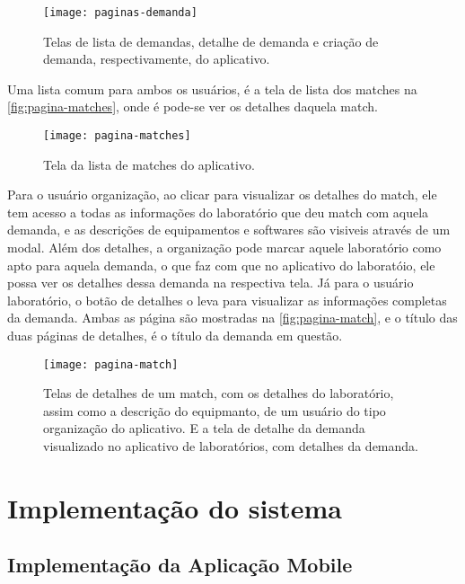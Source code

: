 \begin{figure}[htb]
  \captionsetup{width=0.43\textwidth}
  \caption{Telas de lista de demandas, detalhe de demanda e criação de demanda, respectivamente, do aplicativo.}
  \label{fig:paginas-demanda}
  \texttt{[image: paginas-demanda]}
  \fonte{}
\end{figure}

Uma lista comum para ambos os usuários, é a tela de lista dos matches na \autoref{fig:pagina-matches}, onde é pode-se ver os detalhes daquela match.

\begin{figure}[htb]
  \captionsetup{width=0.43\textwidth}
  \caption{Tela da lista de matches do aplicativo.}
  \label{fig:pagina-matches}
  \texttt{[image: pagina-matches]}
  \fonte{}
\end{figure}

Para o usuário organização, ao clicar para visualizar os detalhes do match, ele tem acesso a todas as informações do laboratório que deu match com aquela demanda, e as descrições de equipamentos e softwares são visiveis através de um modal. Além dos detalhes, a organização pode marcar aquele laboratório como apto para aquela demanda, o que faz com que no aplicativo do laboratóio, ele possa ver os detalhes dessa demanda na respectiva tela. Já para o usuário laboratório, o botão de detalhes o leva para visualizar as informações completas da demanda. Ambas as página são mostradas na \autoref{fig:pagina-match}, e o título das duas páginas de detalhes, é o título da demanda em questão.

\begin{figure}[htb]
  \captionsetup{width=0.43\textwidth}
  \caption{Telas de detalhes de um match, com os detalhes do laboratório, assim como a descrição do equipmanto, de um usuário do tipo organização do aplicativo. E a tela de detalhe da demanda visualizado no aplicativo de laboratórios, com detalhes da demanda.}
  \label{fig:pagina-match}
  \texttt{[image: pagina-match]}
  \fonte{}
\end{figure}


\section{Implementação do sistema}\label{sec:implementacao}

\subsection{Implementação da Aplicação Mobile}\label{subsec:aplicacao}


